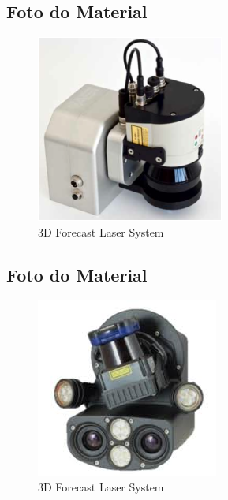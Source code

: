 \documentclass{article}
\begin{document}
\subsection{Foto do Material}
\begin{figure}[H]
 \centering
 \includegraphics[width=0.4\columnwidth]{figs/forecast/foto.png}
 \caption{3D Forecast Laser System}
\end{figure}

\subsection{Foto do Material}
\begin{figure}[H]
 \centering
 \includegraphics[width=0.4\columnwidth]{figs/multisense/multisense}
 \caption{3D Forecast Laser System}
\end{figure}
\end{document}
